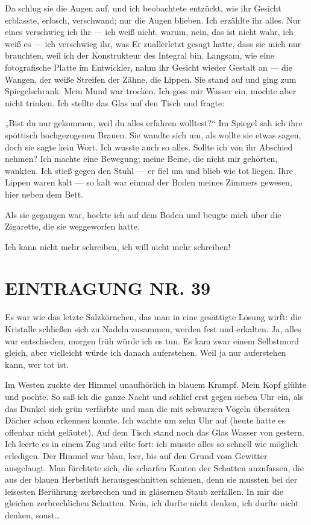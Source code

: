 Da schlug sie die Augen auf, und ich beobachtete entzückt, wie ihr
Gesicht erblasste, erlosch, verschwand; nur die Augen blieben. Ich
erzählte ihr alles. Nur eines verschwieg ich ihr — ich weiß nicht,
warum, nein, das ist nicht wahr, ich weiß es — ich verschwieg ihr,
was Er zuallerletzt gesagt hatte, dass sie mich nur brauchten, weil
ich der Konstrukteur des Integral bin. Langsam, wie eine
fotografische Platte im Entwickler, nahm ihr Gesicht wieder Gestalt
an — die Wangen, der weiße Streifen der Zähne, die Lippen. Sie
stand auf und ging zum Spiegelschrank. Mein Mund war trocken. Ich
goss mir Wasser ein, mochte aber nicht trinken. Ich stellte das
Glas auf den Tisch und fragte:

„Bist du nur gekommen, weil du alles erfahren wolltest?“ Im Spiegel
sah ich ihre spöttisch hochgezogenen Brauen. Sie wandte sich um,
als wollte sie etwas sagen, doch sie sagte kein Wort. Ich wusste
auch so alles. Sollte ich von ihr Abschied nehmen? Ich machte eine
Bewegung; meine Beine, die nicht mir gehörten, wankten. Ich stieß
gegen den Stuhl — er fiel um und blieb wie tot liegen. Ihre Lippen
waren kalt — so kalt war einmal der Boden meines Zimmers gewesen,
hier neben dem Bett.

Als sie gegangen war, hockte ich auf dem Boden und beugte mich über
die Zigarette, die sie weggeworfen
hatte.

Ich kann nicht mehr schreiben, ich will nicht mehr schreiben!

\section{EINTRAGUNG NR. 39}

Es war wie das letzte Salzkörnchen, das man in eine gesättigte
Lösung wirft: die Kristalle schließen sich zu Nadeln zusammen,
werden fest und erkalten. Ja, alles war entschieden, morgen früh
würde ich es tun. Es kam zwar einem Selbstmord gleich, aber
vielleicht würde ich danach auferstehen. Weil ja nur auferstehen
kann, wer tot ist.

Im Westen zuckte der Himmel unaufhörlich in blauem Krampf. Mein
Kopf glühte und pochte. So saß ich die ganze Nacht und schlief erst
gegen sieben Uhr ein, als das Dunkel sich grün verfärbte und man
die mit schwarzen Vögeln übersäten Dächer schon erkennen konnte.
Ich wachte um zehn Uhr auf (heute hatte es offenbar nicht
geläutet). Auf dem Tisch stand noch das Glas Wasser von gestern.
Ich leerte es in einem Zug und eilte fort: ich musste alles so
schnell wie möglich erledigen. Der Himmel war blau, leer, bis auf
den Grund vom Gewitter ausgelaugt. Man fürchtete sich, die scharfen
Kanten der Schatten anzufassen, die aus der blauen Herbstluft
herausgeschnitten schienen, denn sie mussten
bei der leisesten Berührung zerbrechen und in gläsernen Staub
zerfallen. In mir die gleichen zerbrechlichen Schatten. Nein, ich
durfte nicht denken, ich durfte nicht denken, sonst\ldots{}

